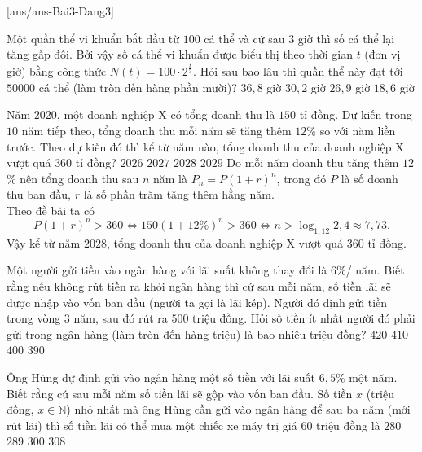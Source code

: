 [ans/ans-Bai3-Dang3]
\begin{ex}
	Một quần thể vi khuẩn bắt đầu từ $100$ cá thể và cứ sau $3$ giờ thì số cá thể lại tăng gấp đôi. Bởi vậy số cá thể vi khuẩn được biểu thị theo thời gian $t$ (đơn vị giờ) bằng công thức $N(t)=100\cdot 2^{\frac{t}{3}}$. Hỏi sau bao lâu thì quần thể này đạt tới $50000$ cá thể (làm tròn đến hàng phần mười)?	
	\choice
	{$36{,}8$ giờ}
	{$30{,}2$ giờ}
	{\True $26{,}9$ giờ}
	{$18{,}6$ giờ}
\end{ex}
\begin{ex}
	Năm $2020$, một doanh nghiệp X có tổng doanh thu là $150$ tỉ đồng. Dự kiến trong $10$ năm tiếp theo, tổng doanh thu mỗi năm sẽ tăng thêm $12$\% so với năm liền trước. Theo dự kiến đó thì kể từ năm nào, tổng doanh thu của doanh nghiệp X vượt quá $360$ tỉ đồng?
	\choice
	{$2026$}
	{$2027$}
	{\True $2028$}
	{$2029$}
	\loigiai
	{
		Do mỗi năm doanh thu tăng thêm $12$\% nên tổng doanh thu sau $n$ năm là $P_n=P(1+r)^n$, trong đó $P$ là số doanh thu ban đầu, $r$ là số phần trăm tăng thêm hằng năm.\\
		Theo đề bài ta có
		\[P(1+r)^n>360\Leftrightarrow 150(1+12\%)^n>360\Leftrightarrow n>\log_{1{,}12}2{,4}\approx7{,}73.\]
		Vậy kể từ năm $2028$, tổng doanh thu của doanh nghiệp X vượt quá $360$ tỉ đồng.
	}
\end{ex}

\begin{ex}
	Một người gửi tiền vào ngân hàng với lãi suất không thay đổi là $6\%$/ năm. Biết rằng nếu không rút tiền ra khỏi ngân hàng thì cứ sau mỗi năm, số tiền lãi sẽ được nhập vào vốn ban đầu (người ta gọi là lãi kép). Người đó định gửi tiền trong vòng $3$ năm, sau đó rút ra $500$ triệu đồng. Hỏi số tiền ít nhất người đó phải gửi trong ngân hàng (làm tròn đến hàng triệu) là bao nhiêu triệu đồng?
	\choice
	{\True $420$}
	{$410$}
	{$400$}
	{$390$}
\end{ex}

\begin{ex}
	Ông Hùng dự định gửi vào ngân hàng một số tiền với lãi suất $6{,}5\%$ một năm. Biết rằng cứ sau mỗi năm số tiền lãi sẽ gộp vào vốn ban đầu. Số tiền $x$ (triệu đồng, $x\in\mathbb{N}$) nhỏ nhất mà ông Hùng cần gửi vào ngân hàng để sau ba năm (mới rút lãi) thì số tiền lãi có thể mua một chiếc xe máy trị giá $60$ triệu đồng là
	\choice
	{$280$}
	{\True $289$}
	{$300$}
	{$308$}
\end{ex}


